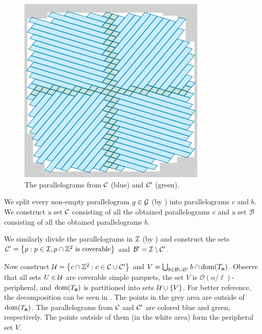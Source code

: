 \documentclass[11pt]{article}
\newcommand{\Z}{\mathbb{Z}}
\renewcommand{\O}{\mathcal{O}}
\newcommand{\set}[1]{\left\lbrace #1 \right\rbrace}
\theoremstyle{plain}
\theoremstyle{definition}
\theoremstyle{remark}
\DeclareMathOperator*{\dom}{dom}
\begin{document}
\newcommand{\B}{\mathcal{B}}

\begin{figure}[!t]
	\begin{center}
		\includegraphics[width=0.8\textwidth]{drawings/text_decomposition}
	\end{center}
	\caption{The parallelograms from $\mathcal{C}$ (blue) and $\mathcal{C}'$ (green).}
	\label{figure:text_decomposition}
\end{figure}

We split every non-empty parallelogram $g \in \mathcal{G}$ (by ) into parallelograms $c$ and $b$.
We construct a set $\mathcal{C}$ consisting of all the obtained parallelograms $c$ and a set $\B$ consisting of all the obtained parallelograms $b$.

We similarly divide the parallelograms in $\mathcal{I}$ (by ) and construct the sets $\C' = \set{p : p \in \I, p \cap \Z^2 \text{ is coverable}}$ and $\B' = \I \setminus \C'$.

Now construct $\U = \set{c \cap \Z^2 : c \in \C \cup \C'}$ and $V = \bigcup_{b \in \B \cup B'} b \cap \d{\Ta}$.
Observe that all sets $U \in \mathcal{U}$ are coverable simple parquets, the set $V$ is $\O(n / \ell)$-peripheral, and $\d{\Ta}$ is partitioned into sets $\U \cup \set{V}$.
For better reference, the decomposition can be seen in .
The points in the grey area are outside of $\dom(\Ta)$.
The parallelograms from $\mathcal{C}$ and $\mathcal{C}'$ are colored blue and green, respectively.
The points outside of them (in the white area) form the peripheral set $V$.
\end{document}
